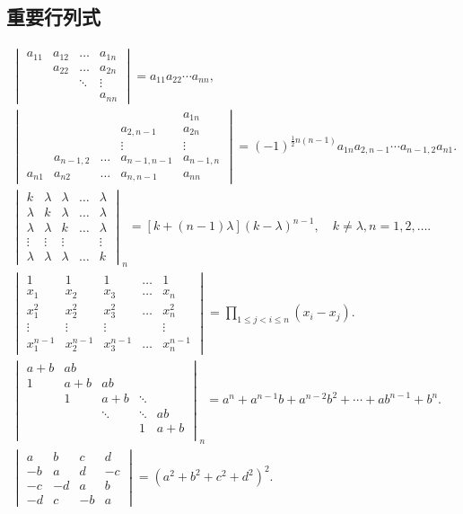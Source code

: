 \subsection*{重要行列式}
\begin{gather*}
	\begin{vmatrix}
		a_{11} & a_{12} & \dots & a_{1n} \\
		& a_{22} & \dots & a_{2n} \\
		& & \ddots & \vdots \\
		& & & a_{nn}
	\end{vmatrix}
	= a_{11} a_{22} \dotsm a_{nn}, \\%
	\begin{vmatrix}
		& & & & a_{1n} \\
		& & & a_{2,n-1} & a_{2n} \\
		& & & \vdots & \vdots \\
		& a_{n-1,2} & \dots & a_{n-1,n-1} & a_{n-1,n} \\
		a_{n1} & a_{n2} & \dots & a_{n,n-1} & a_{nn}
	\end{vmatrix}
	=(-1)^{\frac{1}{2}n(n-1)} a_{1n} a_{2,n-1} \dotsm a_{n-1,2} a_{n1}. \\
	\begin{vmatrix}
		k & \lambda & \lambda & \dots & \lambda \\
		\lambda & k & \lambda & \dots & \lambda \\
		\lambda & \lambda & k & \dots & \lambda \\
		\vdots & \vdots & \vdots & & \vdots \\
		\lambda & \lambda & \lambda & \dots & k
	\end{vmatrix}_n
	= [k+(n-1)\lambda] (k-\lambda)^{n-1},
	\quad k\neq\lambda,n=1,2,\dotsc. \\
	\begin{vmatrix}
		1 & 1 & 1 & \dots & 1 \\
		x_1 & x_2 & x_3 & \dots & x_n \\
		x_1^2 & x_2^2 & x_3^2 & \dots & x_n^2 \\
		\vdots & \vdots & \vdots& & \vdots \\
		x_1^{n-1} & x_2^{n-1} & x_3^{n-1} & \dots & x_n^{n-1}
	\end{vmatrix}
	= \prod_{1 \leq j < i \leq n}(x_i-x_j). \\
	\begin{vmatrix}
		a+b & ab & \\
		1 & a+b & ab & \\
		& 1 & a + b & \ddots & \\
		& & \ddots & \ddots & ab \\
		& & & 1 & a+b \\
	\end{vmatrix}_n
	= a^n + a^{n-1} b + a^{n-2} b^2 + \dotsb + a b^{n-1} + b^n. \\
	\begin{vmatrix}
		a & b & c & d \\
		-b & a & d & -c \\
		-c & -d & a & b \\
		-d & c & -b & a
	\end{vmatrix}
	= (a^2+b^2+c^2+d^2)^2.
\end{gather*}
